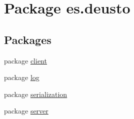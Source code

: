 \hypertarget{namespacees_1_1deusto}{}\section{Package es.\+deusto}
\label{namespacees_1_1deusto}
\subsection*{Packages}
\begin{DoxyCompactItemize}
\item 
package \hyperlink{namespacees_1_1deusto_1_1client}{client}
\item 
package \hyperlink{namespacees_1_1deusto_1_1log}{log}
\item 
package \hyperlink{namespacees_1_1deusto_1_1serialization}{serialization}
\item 
package \hyperlink{namespacees_1_1deusto_1_1server}{server}
\end{DoxyCompactItemize}
